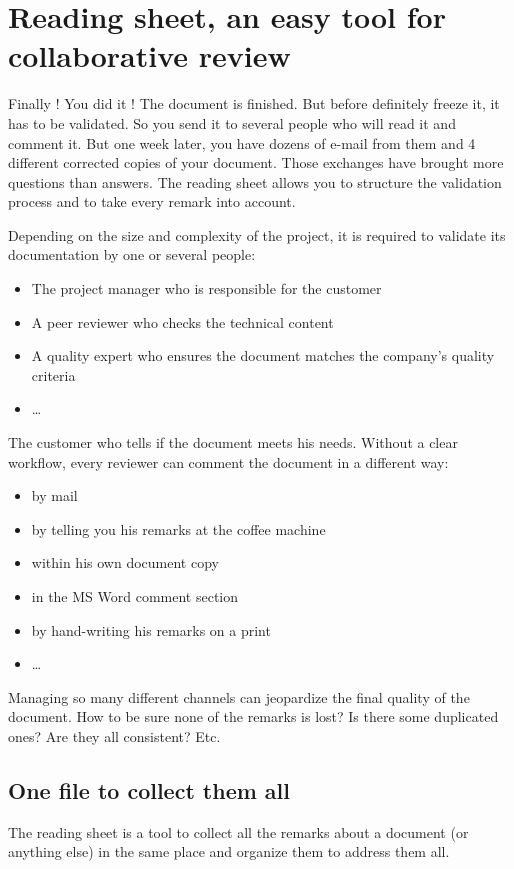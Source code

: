 \setchapterpreamble[u]{\margintoc}
\chapter{Reading sheet, an easy tool for collaborative review}
\label{sec:ReadingSheet}

Finally ! You did it ! The document is finished. But before definitely freeze it, it has to be validated. So you send it to several people who will read it and comment it. But one week later, you have dozens of e-mail from them and 4 different corrected copies of your document. Those exchanges have brought more questions than answers. The reading sheet allows you to structure the validation process and to take every remark into account.

Depending on the size and complexity of the project, it is required to validate its documentation by one or several people:

\begin{itemize}
    \item The project manager who is responsible for the customer
    \item A peer reviewer who checks the technical content
    \item A quality expert who ensures the document matches the company’s quality criteria
    \item …
\end{itemize}

The customer who tells if the document meets his needs.
Without a clear workflow, every reviewer can comment the document in a different way:
\begin{itemize}
    \item by mail
    \item by telling you his remarks at the coffee machine
    \item within his own document copy
    \item in the MS Word comment section
    \item by hand-writing his remarks on a print
    \item …
\end{itemize}

Managing so many different channels can jeopardize the final quality of the document. How to be sure none of the remarks is lost? Is there some duplicated ones? Are they all consistent? Etc.

\section{One file to collect them all}
The reading sheet is a tool to collect all the remarks about a document (or anything else) in the same place and organize them to address them all.

